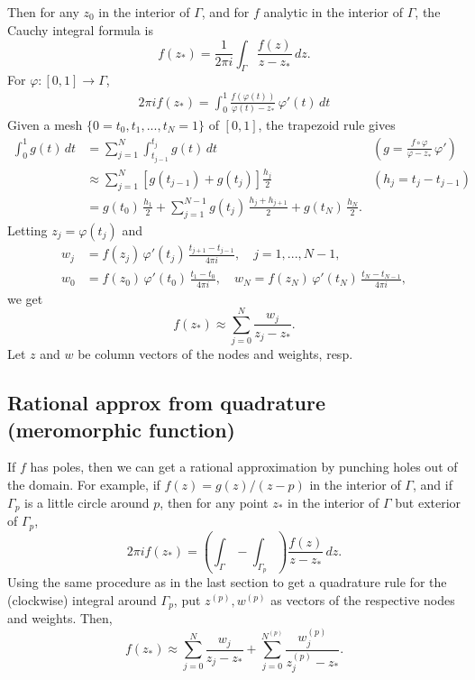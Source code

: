 Then for any $z_0$ in the interior of $\Gamma$, and for 
$f$ analytic in the interior of $\Gamma$, the Cauchy
integral formula is
\[
 f(z_\ast) = \frac{1}{2\pi i}\int_\Gamma
             \frac{f(z)}{z-z_\ast}\,dz.
\]
For $\varphi : [0,1] \rightarrow \Gamma$,
\begin{align*}
 2\pi i f(z_\ast)
 = \int_0^1 \frac{f(\varphi(t))}{\varphi(t)-z_\ast}
   \,\varphi'(t)\,dt
\end{align*}
Given a mesh $\lbrace 0 = t_0,t_1,...,t_N=1 \rbrace$
of $[0,1]$, the trapezoid rule gives
\begin{align*}
 \int_0^1 g(t)\,dt 
 &= \sum_{j=1}^N \int_{t_{j-1}}^{t_j}
    g(t)\,dt 
    \qquad & \left( g = \frac{f\circ\varphi}
                             {\varphi - z_\ast}\,\varphi' \right) \\ 
 &\approx \sum_{j=1}^N 
    \left[g(t_{j-1}) + g(t_j)\right]
    \frac{h_j}{2} 
    \qquad & \left( h_j = t_j - t_{j-1} \right) \\ 
 &= g(t_0)\,\frac{h_1}{2} + 
    \sum_{j=1}^{N-1}
    g(t_j)\,\frac{h_j + h_{j+1}}{2} + 
    g(t_N)\,\frac{h_N}{2}.
\end{align*}
Letting $z_j = \varphi(t_j)$ and 
\begin{align*}
 w_j &= f(z_j)\,\varphi'(t_j)\,\frac{t_{j+1}-t_{j-1}}{4\pi i},
 \quad j = 1,...,N-1, \\ 
 w_0 &= f(z_0)\,\varphi'(t_0)\,\frac{t_1 - t_0}{4\pi i},
 \quad
 w_N = f(z_N)\,\varphi'(t_N)\,\frac{t_N - t_{N-1}}{4\pi i},
\end{align*}
we get
\[
 f(z_\ast) \approx \sum_{j=0}^N \frac{w_j}{z_j - z_\ast}.
\]
Let $z$ and $w$ be column vectors of the nodes and weights, resp.

\subsection{Rational approx from quadrature (meromorphic function)}

If $f$ has poles, then we can get a rational approximation by
punching holes out of the domain. For example, if 
$f(z) = g(z)/(z-p)$ in the interior of $\Gamma$, and if
$\Gamma_p$ is a little circle around $p$, then for any point
$z_\ast$ in the interior of $\Gamma$ but exterior of $\Gamma_p$,
\[
 2\pi i f(z_\ast) = \left( \int_\Gamma - \int_{\Gamma_p} \right)
         \frac{f(z)}{z-z_\ast}\,dz.
\]
Using the same procedure as in the last section to 
get a quadrature rule for the (clockwise) integral around
$\Gamma_p$, put $z^{(p)},w^{(p)}$ as vectors
of the respective
nodes and weights. Then,
\[
 f(z_\ast) \approx 
   \sum_{j=0}^N \frac{w_j}{z_j-z_\ast} + 
   \sum_{j=0}^{N^{(p)}} \frac{w_j^{(p)}}{z_j^{(p)}-z_\ast}.
\]

